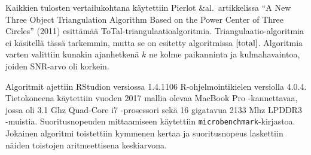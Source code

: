 \documentclass[
  12pt,
  a4paper, twoside]{book}
\begin{document}
Kaikkien tulosten vertailukohtana käytettiin Pierlot \&al.~artikkelissa ``A New Three Object Triangulation Algorithm Based on the Power Center of Three Circles'' (2011) esittämää ToTal-triangulaatioalgoritmia. \citep{Pierlot-2011} Triangulaatio-algoritmia ei käsitellä tässä tarkemmin, mutta se on esitetty algoritmissa \(\ref{total}\). Algoritmia varten valittiin kunakin ajanhetkenä \(k\) ne kolme paikanninta ja kulmahavaintoa, joiden SNR-arvo oli korkein.

Algoritmit ajettiin RStudion versiossa 1.4.1106 R-ohjelmointikielen versiolla 4.0.4. Tietokoneena käytettiin vuoden 2017 mallia olevaa MacBook Pro -kannettavaa, jossa oli 3.1 Ghz Quad-Core i7 -prosessori sekä 16 gigatavua 2133 Mhz LPDDR3 -muistia. Suoritusnopeuden mittaamiseen käytettiin \texttt{microbenchmark}-kirjastoa. Jokainen algoritmi toistettiin kymmenen kertaa ja suoritusnopeus laskettiin näiden toistojen aritmeettisena keskiarvona.
\end{document}
